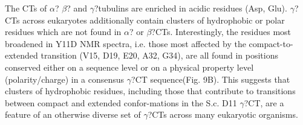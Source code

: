 The CTs of $\alpha$? $\beta$? and $\gamma$?tubulins are enriched in acidic residues (Asp, Glu). $\gamma$?CTs across eukaryotes additionally contain clusters of hydrophobic or polar residues which are not found in $\alpha$? or $\beta$?CTs. Interestingly, the residues most broadened in Y11D NMR spectra, i.e. those most affected by the compact-to-extended transition (V15, D19, E20, A32, G34), are all found in positions conserved either on a sequence level or on a physical property level (polarity/charge) in a consensus $\gamma$?CT sequence(Fig. 9B). This suggests that clusters of hydrophobic residues, including those that contribute to transitions between compact and extended confor-mations in the S.c. D11 $\gamma$?CT, are a feature of an otherwise diverse set of $\gamma$?CTs across many eukaryotic organisms.  
